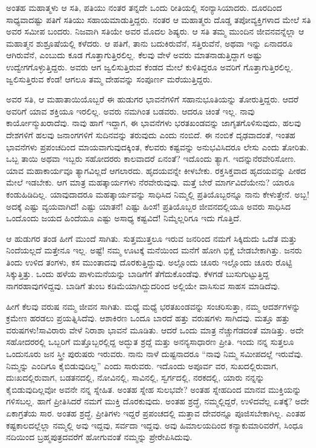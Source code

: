 ಅಂತಹ ಮಹಾತ್ಮಳು ಆ ಸತಿ, ಪತಿಯು ನಂತರ ತನ್ನದೇ ಒಂದು ರೀತಿಯಲ್ಲಿ ಸಂನ್ಯಾಸಿಯಾದರು. ದೂರದಿಂದ ಸಾಧ್ಯವಾದಷ್ಟು ಪತಿಗೆ ಸತಿಯು ಸಹಾಯ\break ಮಾಡುತ್ತಿದ್ದರು. ನಂತರ ಆ ಮಹಾತ್ಮರು ದೊಡ್ಡ ತಪೋವ್ಯಕ್ತಿಗಳಾದ ಮೇಲೆ ಸತಿ ಅವರ ಸಮೀಪ ಬಂದರು. ನಿಜವಾಗಿ ಸತಿಯೇ ಅವರ ಮೊದಲ ಶಿಷ್ಯರು. ಆ ಸತಿ ತಮ್ಮ ಮುಂದಿನ ಜೀವನವನ್ನೆಲ್ಲಾ ಆ ಮಹಾತ್ಮನ ಶುಶ್ರೂಷೆಯಲ್ಲಿ ಕಳೆದರು. ಆ ಪತಿಗೆ, ತಾನು ಬದುಕಿರುವೆನೆ, ಸತ್ತಿರುವೆನೆ, ಅಥವಾ ಇನ್ನು ಏನಾದರೂ ಆಗಿರುವೆನೆ, ಎಂಬುದು ಕೂಡ ಗೊತ್ತಾಗುತ್ತಿರಲಿಲ್ಲ. ಕೆಲವು ವೇಳೆ ಅವರು ಮಾತನಾಡುತ್ತಿದ್ದಾಗ ಅಷ್ಟು ಉದ್ವೇಗಗೊಳ್ಳುತ್ತಿದ್ದರು. ಅವರು ಆಗ ಜ್ವಲಿಸುತ್ತಿರುವ ಕೆಂಡದ ಮೇಲೆ ಕುಳಿತಿದ್ದರೂ ಅವರಿಗೆ ಗೊತ್ತಾಗುತ್ತಿರಲಿಲ್ಲ. ಜ್ವಲಿಸುತ್ತಿರುವ ಕೆಂಡ! ಆಗಲೂ ತಮ್ಮ ದೇಹವನ್ನು ಸಂಪೂರ್ಣ ಮರೆಯುತ್ತಿದ್ದರು.

ಅವರ ಸತಿ, ಆ ಮಹಾತಾಯಿಯೊಬ್ಬರೆ ಈ ಹುಡುಗರ ಭಾವನೆಗಳಿಗೆ ಸಹಾನುಭೂತಿಯನ್ನು ತೋರುತ್ತಿದ್ದರು. ಆದರೆ ಅವರಿಗೆ ಯಾವ ಶಕ್ತಿಯೂ ಇರಲಿಲ್ಲ. ಅವರು ನಮಗಿಂತ ಬಡವರು. ಆದರೂ ಚಿಂತೆ ಇಲ್ಲ. ನಾವು ಕಾರ್ಯೋನ್ಮುಖರಾದೆವು. ನಾವು ಹಾಗೆ ಇದ್ದಾಗ, ಈ ಭಾವನೆಗಳು ಭರತಖಂಡವನ್ನು ಜಾಗೃತಗೊಳಿಸುವುದು, ಹಲವು ದೇಶಗಳಿಗೆ ಹಲವು ಜನಾಂಗಗಳಿಗೆ ಸುದಿನವನ್ನು ತರುವುದು ಎಂದು ನಂಬಿದೆ. ಈ ನಂಬಿಕೆ ದೃಢವಾದಂತೆ, ಇಂತಹ ಭಾವನೆಗಳು ಪ್ರಪಂಚದಿಂದ ಮಾಯವಾಗುವುದಕ್ಕಿಂತ, ಕೆಲವರು ಕಷ್ಟವನ್ನು ಅನುಭವಿಸಿದರೂ ಲೇಸು ಎಂದು ತೋರಿತು. ಒಬ್ಬ ತಾಯಿ ಅಥವಾ ಇಬ್ಬರು ಸಹೋದರರು ಕಾಲವಾದರೆ ಏನಂತೆ? ಇದೊಂದು ತ್ಯಾಗ. ಇದನ್ನು\break ನೆರವೇರಿಸೋಣ. ಯಾವ ಮಹಾಕಾರ್ಯವೂ ತ್ಯಾಗವಿಲ್ಲದೆ ಆಗಲಾರದು. ಹೃದಯವನ್ನೇ ಕೀಳಬೇಕು. ರಕ್ತಸಿಕ್ತವಾದ ಹೃದಯವನ್ನು ಪೀಠದ ಮೇಲೆ ಇಡಬೇಕು. ಆಗ ಮಾತ್ರ ಮಹತ್ಕಾರ್ಯಗಳು ನೆರವೇರುವುವು. ಮತ್ತೆ ಬೇರೆ ಮಾರ್ಗವಿದೆಯೇನು? ಯಾರೂ ಕಂಡುಹಿಡಿದಿಲ್ಲ. ಯಾವುದಾದರೂ ಮಹತ್ಕಾರ್ಯವನ್ನು ಸಾಧಿಸಿದ ನಿಮ್ಮಲ್ಲಿ ಪ್ರತಿಯೊಬ್ಬರನ್ನೂ ನಾನು ಕೇಳುತ್ತೇನೆ. ಅಬ್ಬ! ಅದಕ್ಕೆ ಎಷ್ಟು ವ್ಯಯವಾಗಿದೆ! ಎಷ್ಟು ಯಾತನೆ! ಎಷ್ಟು ಹಿಂಸೆ! ಪ್ರತಿಯೊಬ್ಬರ ಜೀವನದಲ್ಲಿಯೂ ಅವರು ಸಾಧಿಸಿದ ಒಂದೊಂದು ಜಯದ ಹಿಂದೆಯೂ ಎಷ್ಟು ಅಸಾಧ್ಯ ಕಷ್ಟವಿದೆ! ನಿಮ್ಮೆಲ್ಲರಿಗೂ ಇದು ಗೊತ್ತಿದೆ.

ಆ ಹುಡುಗರ ತಂಡ ಹೀಗೆ ಮುಂದೆ ಸಾಗಿತು. ಸುತ್ತಮುತ್ತಲೂ ಇರುವ ಜನರಿಂದ ನಮಗೆ ಸಿಕ್ಕಿದುದು ಒದೆತ ಮತ್ತು ನಿಂದೆಯಲ್ಲದೆ ಮತ್ತೇನೂ ಇಲ್ಲ. ಅಷ್ಟೆ! ನಮ್ಮ ಊಟಕ್ಕೆ ಮನೆಯಿಂದ ಮನೆಗೆ ಹೋಗಿ ಭಿಕ್ಷೆ ಬೇಡಬೇಕಾಗಿತ್ತು. ಜನರು ತಿಂದು ಉಳಿದ ತಂಗಳು, ಕಸ ಮುಂತಾದವು ದೊರಕುತ್ತಿದ್ದುವು. ಅಲ್ಲೊಂದು ಚೂರು ಇಲ್ಲೊಂದು ಚೂರು ರೊಟ್ಟಿ ಸಿಕ್ಕುತ್ತಿತ್ತು. ಒಂದು ಹಳೆಯ ಪಾಳುಮನೆಯನ್ನು ಬಾಡಿಗೆಗೆ ತೆಗೆದುಕೊಂಡೆವು. ಕೆಳಗಡೆ ಬುಸುಗುಟ್ಟುತ್ತಿದ್ದ ನಾಗರಹಾವುಗಳಿದ್ದವು. ಬಾಡಿಗೆ ತುಂಬ ಕಡಿಮೆಯಾಗಿದ್ದುದರಿಂದ ಅಲ್ಲಿಯೇ ವಾಸಿಸುವ ಸಾಹಸ ಮಾಡಿದೆವು.

ಹೀಗೆ ಕೆಲವು ವರುಷ ನಮ್ಮ ಜೀವನ ಸಾಗಿತು. ಮಧ್ಯೆ ಮಧ್ಯೆ ಭರತಖಂಡವನ್ನು ಸಂಚರಿಸುತ್ತಾ, ನಮ್ಮ ಆದರ್ಶಗಳನ್ನು ಕ್ರಮೇಣ ಹರಡಲು ಪ್ರಯತ್ನಿಸಿದೆವು. ಆಶಾಕಿರಣ ಒಂದೂ ಬಾರದೆ ಹತ್ತು ವರುಷಗಳು ಸಾಗಿದವು. ಮತ್ತೂ ಹತ್ತು ವರುಷಗಳು!ಸಾವಿರಾರು ವೇಳೆ ನಿರಾಶಾ ಭಾವನೆ ಮೂಡಿತು. ಆದರೆ ಒಂದು ಮಾತ್ರ ನೆಚ್ಚುಗೆಡದಂತೆ ಮಾಡಿತ್ತು. ಅದೇ ಸಹೋದರರಲ್ಲಿ ಒಬ್ಬರಿಗೆ ಮತ್ತೊಬ್ಬರಲ್ಲಿದ್ದ ಅದ್ಭುತ ಶ್ರದ್ದೆ ಮತ್ತು ಅನನ್ಯಸಾಧಾರಣ ಪ್ರೀತಿ. ಇಂದು ನನ್ನ ಸುತ್ತಲೂ ಒಂದುನೂರು ಜನ ಸ್ತ್ರೀ ಪುರುಷರು ಇರುವರು. ನಾನು ನಾಳೆ ದುಷ್ಟನಾದರೂ “ನಾವು ನಿಮ್ಮ ಸಮೀಪದಲ್ಲೆ ಇರುವೆವು. ನಿಮ್ಮನ್ನು ಎಂದಿಗೂ ಕೈಬಿಡುವುದಿಲ್ಲ” ಎಂದು ಸಾರುವರು. ಇದೊಂದು ಅಪೂರ್ವ ವರ, ಸುಖದಲ್ಲಿರುವಾಗ, ದುಃಖದಲ್ಲಿರುವಾಗ, ಬಡತನದಲ್ಲಿ, ನೋವಿನಲ್ಲಿ, ಸಾವಿನಲ್ಲಿ, ಸ್ವರ್ಗದಲ್ಲಿ, ನರಕದಲ್ಲಿ, ಯಾರು ನನ್ನನ್ನು ಕೈಬಿಡುವುದಿಲ್ಲವೋ ಅವನೇ ನನ್ನ ಸ್ನೇಹಿತ. ಅಂತಹ ಸ್ನೇಹ ಸುಲಭವೇ? ಅಂತಹ ಸ್ನೇಹದಿಂದ ಮಾನವ ಮುಕ್ತಿಯನ್ನು ಗಳಿಸಬಲ್ಲ. ಹಾಗೆ ಪ್ರೀತಿಸಿದರೆ ನಮಗೆ ಮುಕ್ತಿ ದೊರಕುವುದು. ಅಂತಹ ಶ್ರದ್ಧೆ, ನಮ್ಮಲ್ಲಿದ್ದರೆ, ಉಳಿದವೆಲ್ಲ ಏತಕ್ಕೆ? ಅದೇ ಏಕಾಗ್ರತೆಯ ಸಾರ. ಅಂತಹ ಶ್ರದ್ಧೆ, ಪ್ರೀತಿಗಳು ಇದ್ದರೆ ಪ್ರಪಂಚದಲ್ಲಿ ಮತ್ತಾವ ದೇವರನ್ನೂ ಪೂಜಿಸಬೇಕಾಗಿಲ್ಲ. ಎಂತಹ ಕಷ್ಟಕಾಲದಲ್ಲೆಲ್ಲಾ ನಮ್ಮಲ್ಲಿ ಅವು ಇದ್ದವು, ಸರ್ವದಾ ಇದ್ದವು. ಅವು ಹಿಮಾಲಯದಿಂದ ಕನ್ಯಾಕುಮಾರಿವರೆಗೆ, ಸಿಂಧೂ ನದಿಯಿಂದ ಬ್ರಹ್ಮಪುತ್ರದವರೆಗೆ ಹೋಗುವಂತೆ ನಮ್ಮನ್ನು ಪ್ರೇರೇಪಿಸಿದುವು.

